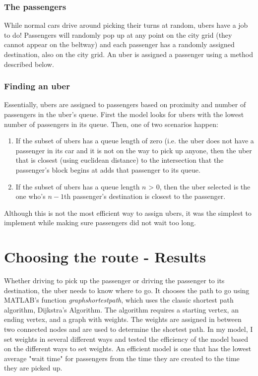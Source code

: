 \documentclass{article}
\begin{document}
\subsubsection{The passengers}
While normal cars drive around picking their turns at random, ubers have a job to do! Passengers will randomly pop up at any point on the city grid (they cannot appear on the beltway) and each passenger has a randomly assigned destination, also on the city grid. An uber is assigned a passenger using a method described below.

\subsubsection{Finding an uber}
Essentially, ubers are assigned to passengers based on proximity and number of passengers in the uber's queue. First the model looks for ubers with the lowest number of passengers in its queue. Then, one of two scenarios happen:
\begin{enumerate}
\item If the subset of ubers has a queue length of zero (i.e. the uber does not have a passenger in its car and it is not on the way to pick up anyone, then the uber that is closest (using euclidean distance) to the intersection that the passenger's block begins at adds that passenger to its queue.
\item If the subset of ubers has a queue length $n$ > $0$, then the uber selected is the one who's $n-1$th passenger's destination is closest to the passenger.
\end{enumerate}
Although this is not the most efficient way to assign ubers, it was the simplest to implement while making sure passengers did not wait too long.

\section{Choosing the route - Results}
Whether driving to pick up the passenger or driving the passenger to its destination, the uber needs to know where to go. It chooses the path to go using MATLAB's function \textit{graphshortestpath}, which uses the classic shortest path algorithm, Dijkstra's Algorithm. The algorithm requires a starting vertex, an ending vertex, and a graph with weights. The weights are assigned in between two connected nodes and are used to determine the shortest path. In my model, I set weights in several different ways and tested the efficiency of the model based on the different ways to set weights. An efficient model is one that has the lowest average "wait time" for passengers from the time they are created to the time they are picked up.
\end{document}
